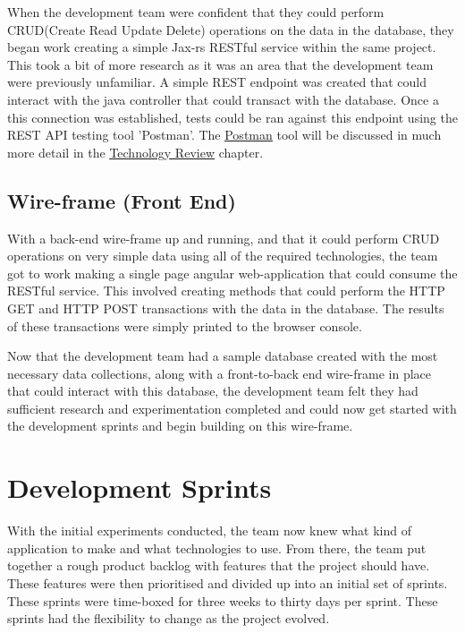 \bigskip

When the development team were confident that they could perform CRUD(Create Read Update Delete) operations on the data in the database, they began work creating a simple Jax-rs RESTful service within the same project. This took a bit of more research as it was an area that the development team were previously unfamiliar. A simple REST endpoint was created that could interact with the java controller that could transact with the database. Once a this connection was established, tests could be ran against this endpoint using the REST API testing tool 'Postman'. The \hyperref[sec:TechnologyReviewPostman]{\underline{Postman}} tool will be discussed in much more detail in the \hyperref[sec:TechnologyReview]{\underline{Technology Review}} chapter. 




\subsection{Wire-frame (Front End)}
\label{sec:MethodologyWireFrame2}
With a back-end wire-frame up and running, and that it could perform CRUD operations on very simple data using all of the required technologies, the team got to work making a single page angular web-application that could consume the RESTful service. This involved creating methods that could perform the HTTP GET and HTTP POST transactions with the data in the database. The results of these transactions were simply printed to the browser console. 

\bigskip

Now that the development team had a sample database created with the most necessary data collections, along with a front-to-back end wire-frame in place that could interact with this database, the development team felt they had sufficient research and experimentation completed and could now get started with the development sprints and begin building on this wire-frame.

\section{Development Sprints}
\label{sec:MethodologyDevelopmentSprints}
With the initial experiments conducted, the team now knew what kind of application to make and what technologies to use. From there, the team put together a rough product backlog with features that the project should have. These features were then prioritised and divided up into an initial set of sprints.  These sprints were time-boxed for three weeks to thirty days per sprint. These sprints had the flexibility to change as the project evolved. 

